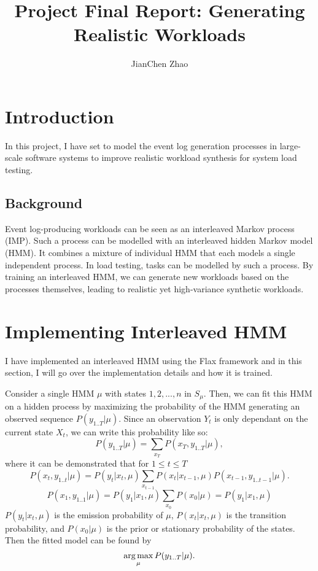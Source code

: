 

\title{Project Final Report: Generating Realistic Workloads}
\author{JianChen Zhao}





\maketitle

\section{Introduction}

In this project, I have set to model the event log generation processes in
large-scale software systems to improve realistic workload synthesis for system
load testing.

\subsection{Background}

Event log-producing workloads can be seen as an interleaved Markov process
(IMP). Such a process can be modelled with an interleaved hidden Markov model
(HMM). It combines a mixture of individual HMM that each models a single
independent process. In load testing, tasks can be modelled by such a process.
By training an interleaved HMM, we can generate new workloads based on the
processes themselves, leading to realistic yet high-variance synthetic
workloads.

\section{Implementing Interleaved HMM}

I have implemented an interleaved HMM using the Flax\cite{Heek2023-nl} framework
and in this section, I will go over the implementation details and how it is
trained.

Consider a single HMM \(\mu\) with states \(1, 2, ...,n\) in \(S_\mu\). Then, we
can fit this HMM on a hidden process by maximizing the probability of the HMM
generating an observed sequence \(P(y_{1..T} | \mu)\). Since an observation
\(Y_t\) is only dependant on the current state \(X_t\), we can write this
probability like so:
\[P(y_{1..T} | \mu) = \sum_{x_T} P(x_T, y_{1..T}| \mu),\] where it can be
demonstrated that for \(1 \leq t \leq T\)
\[P(x_t, y_{1..t} | \mu) = P(y_t|x_t, \mu) \sum_{x_{t-1}} P(x_t|x_{t-1}, \mu) P(x_{t-1}, y_{1..t-1}| \mu).\]
\[P(x_1, y_{1..1} | \mu) = P(y_1|x_1, \mu) \sum_{x_{0}} P(x_0 | \mu) = P(y_1 | x_1, \mu)\]
\(P(y_t|x_t, \mu)\) is the emission probability of \(\mu\), \(P(x_t
| x_t, \mu)\) is the transition probability, and \(P(x_0 | \mu)\) is the prior
or stationary probability of the states. Then the fitted model can be found by
\begin{equation}
    \label{eq:argmax_observation}
    \operatorname*{arg\,max}_{\mu} P(y_{1..T} | \mu).
\end{equation}

